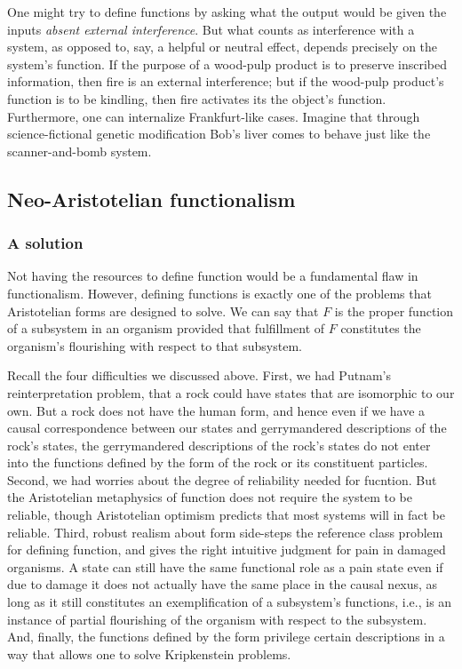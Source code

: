 One might try to define functions by asking what the output would be given the inputs \textit{absent external interference}. 
But what counts as interference with a system, as opposed to, say, a helpful or neutral effect, depends precisely on the system's
function. If the purpose of a wood-pulp product is to preserve inscribed information, then fire is an external interference;
but if the wood-pulp product's function is to be kindling, then fire activates its the object's function. 
Furthermore, one can internalize Frankfurt-like cases. Imagine that through science-fictional genetic modification Bob's liver
comes to behave just like the scanner-and-bomb system. 

\subsection{Neo-Aristotelian functionalism}
\subsubsection{A solution}
Not having the resources to define function would be a fundamental flaw
in functionalism. However, defining functions is exactly one of the problems that Aristotelian forms are designed to solve.  We can say that $F$ is the proper function
of a subsystem in an organism provided that fulfillment of $F$ constitutes the organism's flourishing with respect to that subsystem.

Recall the four difficulties we discussed above. First, we had Putnam's reinterpretation problem, that a rock
could have states that are isomorphic to our own. But a rock does not have the human form, and hence even if we 
have a causal correspondence between our states and gerrymandered descriptions of the rock's states, the gerrymandered
descriptions of the rock's states do not enter into the functions defined by the form of the rock or its constituent
particles. Second, we had worries about the degree of reliability needed for fucntion. But the Aristotelian metaphysics
of function does not require the system to be reliable, though Aristotelian optimism predicts that most systems will 
in fact be reliable. Third, robust realism about form side-steps the reference class problem for defining function,
and gives the right intuitive judgment for pain in damaged organisms. A state can still have the same functional 
role as a pain state even if due to damage it does not actually have the same place in the causal nexus, as long as 
it still constitutes an exemplification of a subsystem's functions, i.e., is an instance of partial flourishing of 
the organism with respect to the subsystem. And, finally, the functions defined by the form privilege certain
descriptions in a way that allows one to solve Kripkenstein problems.

